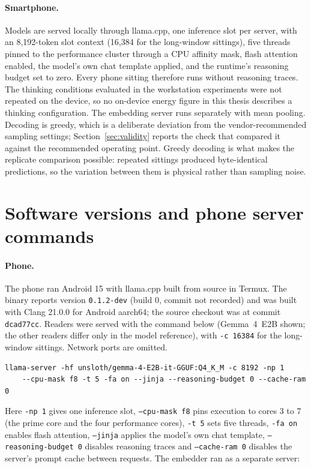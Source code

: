 \paragraph{Smartphone.} Models are served locally through llama.cpp, one inference slot per
server, with an 8,192-token slot context (16,384 for the long-window sittings), five threads
pinned to the performance cluster through a CPU affinity mask, flash attention enabled, the
model's own chat template applied, and the runtime's reasoning budget set to zero. Every
phone sitting therefore runs without reasoning traces. The thinking conditions evaluated in
the workstation experiments were not repeated on the device, so no on-device energy figure
in this thesis describes a thinking configuration. The embedding server runs separately with
mean pooling. Decoding is greedy, which is a deliberate
deviation from the vendor-recommended sampling settings; Section~\ref{sec:validity} reports
the check that compared it against the recommended operating point. Greedy decoding is what
makes the replicate comparison possible: repeated sittings produced byte-identical
predictions, so the variation between them is physical rather than sampling noise.

\section{Software versions and phone server commands}
\label{app:repro_software}

\paragraph{Phone.} The phone ran Android 15 with llama.cpp built from source in Termux. The binary
reports version \texttt{0.1.2-dev} (build 0, commit not recorded) and was built with Clang 21.0.0
for Android aarch64; the source checkout was at commit \texttt{dcad77cc}. Readers were served with
the command below (Gemma~4~E2B shown; the other readers differ only in the model reference), with
\texttt{-c 16384} for the long-window sittings. Network ports are omitted.

\begin{small}
\begin{verbatim}
llama-server -hf unsloth/gemma-4-E2B-it-GGUF:Q4_K_M -c 8192 -np 1
    --cpu-mask f8 -t 5 -fa on --jinja --reasoning-budget 0 --cache-ram 0
\end{verbatim}
\end{small}

Here \texttt{-np 1} gives one inference slot, \texttt{--cpu-mask f8} pins execution to cores 3 to 7
(the prime core and the four performance cores), \texttt{-t 5} sets five threads, \texttt{-fa on}
enables flash attention, \texttt{--jinja} applies the model's own chat template,
\texttt{--reasoning-budget 0} disables reasoning traces and \texttt{--cache-ram 0} disables the
server's prompt cache between requests. The embedder ran as a separate server:

